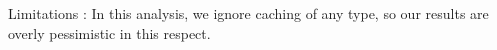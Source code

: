 Limitations :
In this analysis, we ignore caching of any type, so our results are overly 
pessimistic in this respect. 


